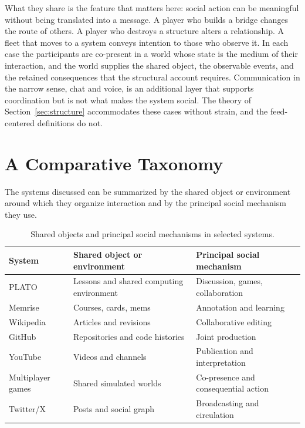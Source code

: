 \documentclass[11pt]{article}
\theoremstyle{remark}
\begin{document}
What they share is the feature that matters here: social action can be meaningful without being translated into a message. A player who builds a bridge changes the route of others. A player who destroys a structure alters a relationship. A fleet that moves to a system conveys intention to those who observe it. In each case the participants are co-present in a world whose state is the medium of their interaction, and the world supplies the shared object, the observable events, and the retained consequences that the structural account requires. Communication in the narrow sense, chat and voice, is an additional layer that supports coordination but is not what makes the system social. The theory of Section~\ref{sec:structure} accommodates these cases without strain, and the feed-centered definitions do not.

\section{A Comparative Taxonomy}

The systems discussed can be summarized by the shared object or environment around which they organize interaction and by the principal social mechanism they use.

\begin{table}[h]
\centering
\small
\begin{tabular}{@{}p{2.8cm}p{5.2cm}p{4.6cm}@{}}
\toprule
System & Shared object or environment & Principal social mechanism \\
\midrule
PLATO & Lessons and shared computing environment & Discussion, games, collaboration \\
Memrise & Courses, cards, mems & Annotation and learning \\
Wikipedia & Articles and revisions & Collaborative editing \\
GitHub & Repositories and code histories & Joint production \\
YouTube & Videos and channels & Publication and interpretation \\
Multiplayer games & Shared simulated worlds & Co-presence and consequential action \\
Twitter/X & Posts and social graph & Broadcasting and circulation \\
\bottomrule
\end{tabular}
\caption{Shared objects and principal social mechanisms in selected systems.}
\end{table}
\end{document}
